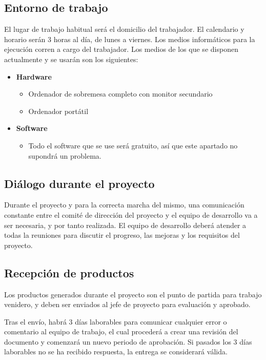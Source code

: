 		\subsection{Entorno de trabajo}

			El lugar de trabajo habitual será el domicilio del trabajador.
			El calendario y horario serán 3 horas al día, de lunes a viernes.
			Los medios informáticos para la ejecución corren a cargo del trabajador. Los medios de los que se disponen actualmente y se usarán son los siguientes: 

			\begin{itemize}
				\item \textbf{Hardware}
				\begin{itemize}
					\item Ordenador de sobremesa completo con monitor secundario
					\item Ordenador portátil
				\end{itemize}
				\item \textbf{Software}
				\begin{itemize}
					\item Todo el software que se use será gratuito, así que este apartado no supondrá un problema.
				\end{itemize}
			\end{itemize}

		\subsection{Diálogo durante el proyecto}

			Durante el proyecto y para la correcta marcha del mismo, una comunicación constante entre el comité de dirección del proyecto y el equipo de desarrollo va a ser necesaria, y por tanto realizada. El equipo de desarrollo deberá atender a todas la reuniones para discutir el progreso, las mejoras y los requisitos del proyecto.

		\subsection{Recepción de productos}

			Los productos generados durante el proyecto son el punto de partida para trabajo venidero, y deben ser enviados al jefe de proyecto para evaluación y aprobado.

			Tras el envío, habrá 3 días laborables para comunicar cualquier error o comentario al equipo de trabajo, el cual procederá a crear una revisión del documento y comenzará un nuevo periodo de aprobación. Si pasados los 3 días laborables no se ha recibido respuesta, la entrega se considerará válida.

